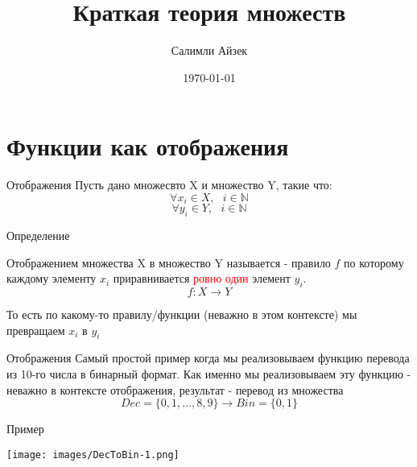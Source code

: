 \documentclass{beamer}
\title[МОП]{Краткая теория множеств}
\author{Салимли Айзек}
\institute{MathLang}
\date{\today}
\newenvironment{rusdefinition}[1][Определение]{
    \begin{block}{#1}
}{\end{block}}
\newenvironment{rexample}[1][Пример]{\begin{exampleblock}{#1}}{\end{exampleblock}}
\begin{document}
\begin{frame}
    \titlepage
\end{frame}



\section{Функции как отображения}

\begin{frame}{Отображения}
    Пусть дано множесвто X и множество Y, такие что: 
    \[ \forall x_i \in X, \texttt{ } i \in \mathbb{N}\]
    \[ \forall y_i \in Y, \texttt{ } i \in \mathbb{N}\]
    \begin{rusdefinition}
        Отображением множества X в множество Y называется - правило $f$ по которому каждому элементу $x_i$ приравнивается \textcolor{red}{ровно один} элемент $y_i$.
        \[ f \colon X \rightarrow Y \]
    \end{rusdefinition}
    То есть по какому-то правилу/функции (неважно в этом контексте) мы превращаем $x_i$ в $y_i$
\end{frame}

\begin{frame}{Отображения}
    Самый простой пример когда мы реализовываем функцию перевода из 10-го числа в бинарный формат.
    Как именно мы реализовываем эту функцию - неважно в контексте отображения, результат - перевод из множества 
    \[ Dec = \{0, 1, \dots, 8, 9\} \rightarrow Bin = \{0, 1\}\]
    \begin{rexample}
    \begin{center}
        \texttt{[image: images/DecToBin-1.png]}
    \end{center}
    \end{rexample}
\end{frame}
\end{document}
